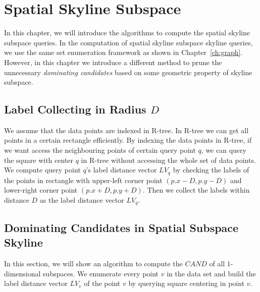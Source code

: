 
%
%

\chapter{Spatial Skyline Subspace}
\label{ch:spatial_skyline_subspace}

In this chapter, we will introduce the algorithms to compute the spatial skyline subspace queries. In the computation of spatial skyline subspace skyline queries, we use the same set enumeration framework as shown in Chapter~\ref{ch:graph}. However, in this chapter we introduce a different method to prune the unnecessary \emph{dominating candidates} based on some geometric property of skyline subspace.

\section{Label Collecting in Radius $D$}
We assume that the data points are indexed in R-tree. In R-tree we can get all points in a certain rectangle efficiently. By indexing the data points in R-tree, if we want access the neighbouring points of certain query point $q$, we can query the square with center $q$ in R-tree without accessing the whole set of data points. We compute query point $q$'s label distance vector $LV_q$ by checking the labels of the points in rectangle with upper-left corner point $(p.x - D, p.y - D)$ and lower-right corner point $(p.x + D, p.y + D)$. Then we collect the labels within distance $D$ as the label distance vector $LV_q$.

\section{Dominating Candidates in Spatial Subspace Skyline}

In this section, we will show an algorithm to compute the $\mathit{CAND}$ of all $1$-dimensional subspaces. We enumerate every point $v$ in the data set and build the label distance vector $LV_v$ of the point $v$ by querying square centering in point $v$.

